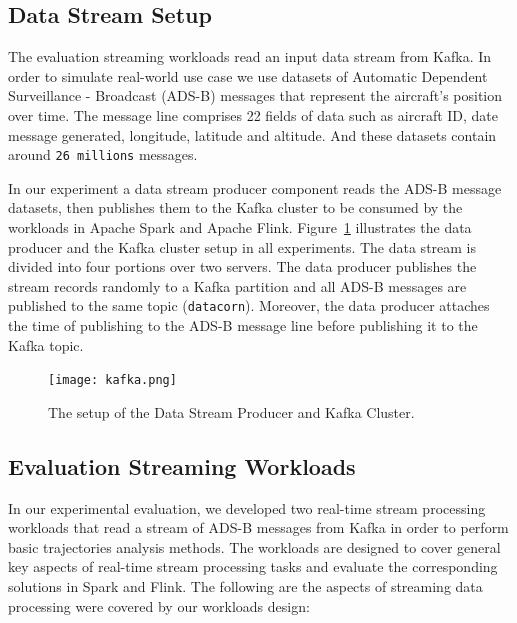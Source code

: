 \documentclass[]{article}
\begin{document}
\subsection{Data Stream Setup}
The evaluation streaming workloads read an input data stream from Kafka. In order to simulate real-world use case we use datasets of Automatic Dependent Surveillance - Broadcast (ADS-B) messages that represent the aircraft's position over time. The message line comprises 22 fields of data such as aircraft ID, date message generated, longitude, latitude and altitude.  And  these datasets contain around \texttt{26 millions} messages.  
\par In our experiment a data stream producer component reads the ADS-B message datasets, then publishes them to the Kafka cluster to be consumed by the workloads in Apache Spark and Apache Flink. Figure~\ref{fig:data_stream} illustrates the data producer and the Kafka cluster setup in all experiments.
The data stream is divided into four portions over two servers. The data producer publishes the stream records randomly to a Kafka partition and all ADS-B messages are published to the same topic (\texttt{datacorn}). Moreover, the data producer attaches the time of publishing to the ADS-B message line before publishing it to the Kafka topic.

\begin{figure}[h]
 
  \centering
    \texttt{[image: kafka.png]}
     \caption{The setup of the Data Stream Producer and Kafka Cluster.}
     \label{fig:data_stream}
\end{figure} 

\newpage
\subsection{Evaluation Streaming Workloads}
In our experimental evaluation, we developed two real-time stream processing workloads that read a stream of ADS-B messages from Kafka in order to perform basic trajectories analysis methods. The workloads are designed to cover general key aspects of real-time stream processing tasks and evaluate the corresponding solutions in Spark and Flink. The following are the aspects of streaming data processing were covered by our workloads design: 
\end{document}
